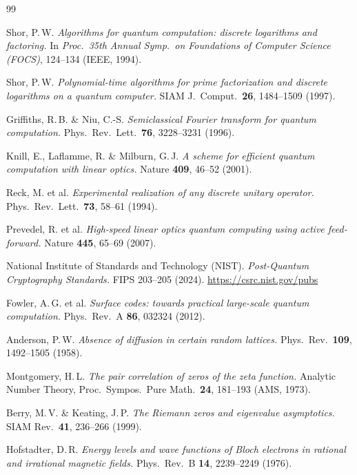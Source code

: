 \begin{thebibliography}{99}

Shor, P.\,W.
\textit{Algorithms for quantum computation: discrete logarithms and factoring.}
In \textit{Proc.\ 35th Annual Symp.\ on Foundations of Computer Science (FOCS)},
124--134 (IEEE, 1994).

Shor, P.\,W.
\textit{Polynomial-time algorithms for prime factorization and discrete
logarithms on a quantum computer.}
SIAM J.\ Comput.\ \textbf{26}, 1484--1509 (1997).

Griffiths, R.\,B. \& Niu, C.-S.
\textit{Semiclassical Fourier transform for quantum computation.}
Phys.\ Rev.\ Lett.\ \textbf{76}, 3228--3231 (1996).

Knill, E., Laflamme, R. \& Milburn, G.\,J.
\textit{A scheme for efficient quantum computation with linear optics.}
Nature \textbf{409}, 46--52 (2001).

Reck, M. et al.
\textit{Experimental realization of any discrete unitary operator.}
Phys.\ Rev.\ Lett.\ \textbf{73}, 58--61 (1994).

Prevedel, R. et al.
\textit{High-speed linear optics quantum computing using active feed-forward.}
Nature \textbf{445}, 65--69 (2007).

National Institute of Standards and Technology (NIST).
\textit{Post-Quantum Cryptography Standards.}
FIPS 203--205 (2024). \url{https://csrc.nist.gov/pubs}

Fowler, A.\,G. et al.
\textit{Surface codes: towards practical large-scale quantum computation.}
Phys.\ Rev.\ A \textbf{86}, 032324 (2012).

Anderson, P.\,W.
\textit{Absence of diffusion in certain random lattices.}
Phys.\ Rev.\ \textbf{109}, 1492--1505 (1958).

Montgomery, H.\,L.
\textit{The pair correlation of zeros of the zeta function.}
Analytic Number Theory, Proc.\ Sympos.\ Pure Math.\ \textbf{24},
181--193 (AMS, 1973).

Berry, M.\,V. \& Keating, J.\,P.
\textit{The Riemann zeros and eigenvalue asymptotics.}
SIAM Rev.\ \textbf{41}, 236--266 (1999).

Hofstadter, D.\,R.
\textit{Energy levels and wave functions of Bloch electrons in rational
and irrational magnetic fields.}
Phys.\ Rev.\ B \textbf{14}, 2239--2249 (1976).

\end{thebibliography}
